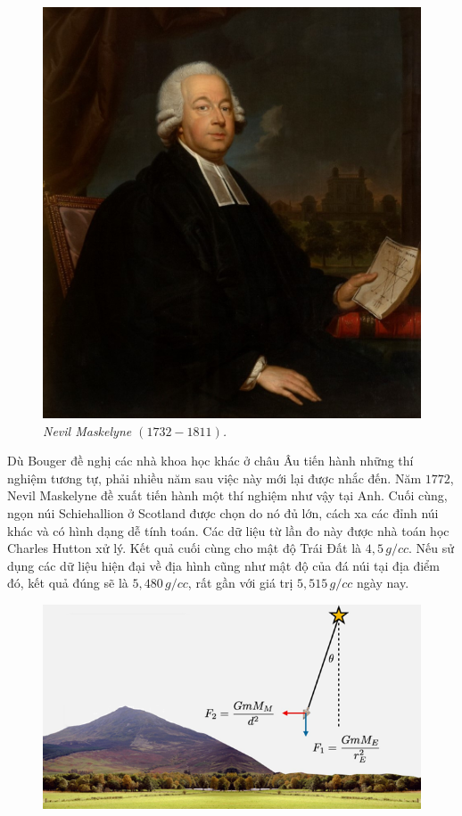 \begin{multicols}{2}
\begin{figure}[H]
		\includegraphics[width =0.75\linewidth]{9}
		\caption{\small\textit{\color{timhieukhoahoc}Nevil Maskelyne $(1732-1811)$.}}
		\vspace*{-5pt}
	\end{figure}
	Dù Bouger đề nghị các nhà khoa học khác ở châu Âu tiến hành những thí nghiệm tương tự, phải nhiều năm sau việc này mới lại được nhắc đến. Năm $1772$, Nevil Maskelyne đề xuất tiến hành một thí nghiệm như vậy tại Anh. Cuối cùng, ngọn núi Schiehallion ở Scotland được chọn do nó đủ lớn, cách xa các đỉnh núi khác và có hình dạng dễ tính toán. Các dữ liệu từ lần đo này được nhà toán học Charles Hutton xử lý. Kết quả cuối cùng cho mật độ Trái Đất là $4{,}5 \,g/cc$. Nếu sử dụng các dữ liệu hiện đại về địa hình cũng như mật độ của đá núi tại địa điểm đó, kết quả đúng sẽ là $5{,}480\, g/cc$, rất gần với giá trị $5{,}515\, g/cc$ ngày nay.
	\begin{figure}[H]
		\vspace*{-5pt}
		\centering
		\captionsetup{labelformat= empty, justification=centering}
		\includegraphics[width =1\linewidth]{10}

\end{figure}
\end{multicols}
